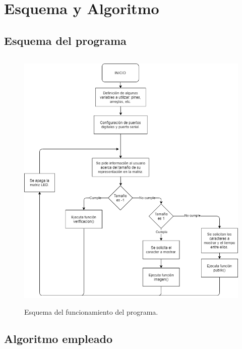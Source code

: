\documentclass{article}
\begin{document}
\newpage
\section{Esquema y Algoritmo} \label{second}

\subsection{Esquema del programa}

\begin{figure}[h]
\includegraphics[height=13cm]{imagenes/diagrama.png}
\centering
\caption{Esquema del funcionamiento del programa.}
\label{fig:diagram}
\end{figure}

\newpage
\subsection{Algoritmo empleado} \label{third}
\end{document}
